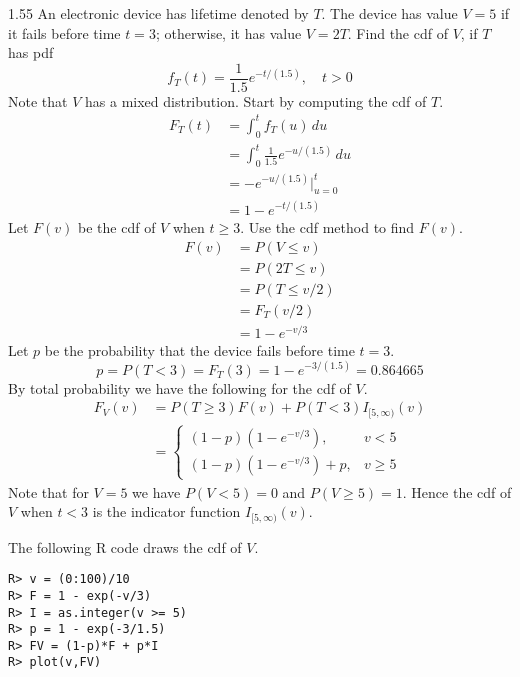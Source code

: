 \documentclass[12pt]{article}
\begin{document}
1.55
An electronic device has lifetime denoted by $T$.
The device has value $V=5$ if it fails before time $t=3$;
otherwise, it has value $V=2T$.
Find the cdf of $V$, if $T$ has pdf
\[
f_T(t)=\frac{1}{1.5}e^{-t/(1.5)},\quad t>0
\]
Note that $V$ has
a mixed distribution.
Start by computing the cdf of $T$.
\begin{align*}
F_T(t)&=\int_0^tf_T(u)\,du\\
&=\int_0^t\frac{1}{1.5}e^{-u/(1.5)}\,du\\
&=-e^{-u/(1.5)}\bigg|_{u=0}^t\\
&=1-e^{-t/(1.5)}
\end{align*}
Let $F(v)$ be the cdf of $V$ when $t\ge3$.
Use the cdf method to find $F(v)$.
\begin{align*}
F(v)&=P(V\le v)\\
&=P(2T\le v)\\
&=P(T\le v/2)\\
&=F_T(v/2)\\
&=1-e^{-v/3}
\end{align*}
Let $p$ be the probability that the device fails before time $t=3$.
\[
p=P(T<3)=F_T(3)=1-e^{-3/(1.5)}=0.864665
\]
By total probability we have the following for the cdf of $V$.
\begin{align*}
F_V(v)&=P(T\ge3)F(v)+P(T<3)I_{[5,\infty)}(v)\\
&=\left\{\begin{array}{ll}
(1-p)(1-e^{-v/3}),&v<5\\
(1-p)(1-e^{-v/3})+p,&v\ge5
\end{array}\right.
\end{align*}
Note that for
$V=5$ we have $P(V<5)=0$ and $P(V\ge5)=1$.
Hence the cdf of $V$ when $t<3$ is the indicator function $I_{[5,\infty)}(v)$.

\bigskip
\noindent
The following R code draws the cdf of $V$.

\begin{verbatim}
R> v = (0:100)/10
R> F = 1 - exp(-v/3)
R> I = as.integer(v >= 5)
R> p = 1 - exp(-3/1.5)
R> FV = (1-p)*F + p*I
R> plot(v,FV)
\end{verbatim}


\end{document}
